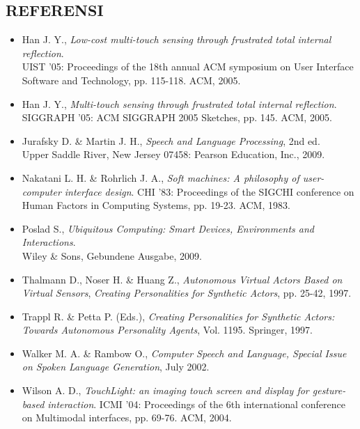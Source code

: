 \subsection*{\textcolor{subsectioncolor}{\textsf{REFERENSI}}}
\begin{itemize}
\item Han J. Y., \emph{Low-cost multi-touch sensing through frustrated total internal reflection}.\\ 
  UIST '05: Proceedings of the 18th annual ACM symposium on User Interface Software and Technology, pp. 115-118. ACM, 2005.
\item Han J. Y., \emph{Multi-touch sensing through frustrated total internal reflection}.\\
  SIGGRAPH '05: ACM SIGGRAPH 2005 Sketches, pp. 145. ACM, 2005.
\item Jurafsky D. \& Martin J. H., \emph{Speech and Language Processing}, 2nd ed.\\
  Upper Saddle River, New Jersey 07458: Pearson Education, Inc., 2009.
\item Nakatani L. H. \& Rohrlich J. A., \emph{Soft machines: A philosophy of user-computer interface design}.
  CHI '83: Proceedings of the SIGCHI conference on Human Factors in Computing Systems, pp. 19-23. ACM, 1983.
\item Poslad S., \emph{Ubiquitous Computing: Smart Devices, Environments and Interactions}.\\
  Wiley \& Sons, Gebundene Ausgabe, 2009.
\item Thalmann D., Noser H. \& Huang Z., \emph{Autonomous Virtual Actors Based on Virtual Sensors}, \emph{Creating Personalities for Synthetic Actors}, pp. 25-42, 1997.
\item Trappl R. \& Petta P. (Eds.), \emph{Creating Personalities for Synthetic Actors: Towards Autonomous Personality Agents}, Vol. 1195. Springer, 1997.
\item Walker M. A. \& Rambow O., \emph{Computer Speech and Language, Special Issue on Spoken Language Generation}, July 2002.
\item Wilson A. D., \emph{TouchLight: an imaging touch screen and display for gesture-based interaction}.
  ICMI '04: Proceedings of the 6th international conference on Multimodal interfaces, pp. 69-76. ACM, 2004.
\end{itemize}
